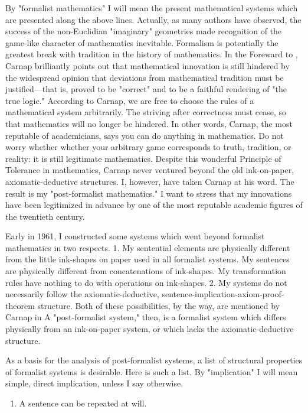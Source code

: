 \documentclass[10pt,twoside]{memoir}
\begin{document}
\begin{enumerate}
{\begin{enumerate}
By "formalist mathematics" I will mean the present mathematical 
systems which are presented along the above lines. Actually, as many authors 
have observed, the success of the non-Euclidian "imaginary" geometries 
made recognition of the game-like character of mathematics inevitable. 
Formalism is potentially the greatest break with tradition in the history of 
mathematics. In the Foreward to , Carnap 
brilliantly points out that mathematical innovation is still hindered by the 
widespread opinion that deviations from mathematical tradition must be 
justified---that is, proved to be "correct" and to be a faithful rendering of 
"the true logic." According to Carnap, we are free to choose the rules of a 
mathematical system arbitrarily. The striving after correctness must cease, so 
that mathematics will no longer be hindered.  In other words, Carnap, the most reputable 
of academicians, says you can do anything in mathematics. Do not worry 
whether whether your arbitrary game corresponds to truth, tradition, or 
reality: it is still legitimate mathematics. Despite this wonderful Principle of 
Tolerance in mathematics, Carnap never ventured beyond the old 
ink-on-paper, axiomatic-deductive structures. I, however, have taken Carnap 
at his word. The result is my "post-formalist mathematics." I want to stress 
that my innovations have been legitimized in advance by one of the most 
reputable academic figures of the twentieth century. 

Early in 1961, I constructed some systems which went beyond 
formalist mathematics in two respects. 1. My sentential elements are 
physically different from the little ink-shapes on paper used in all formalist 
systems. My sentences are physically different from concatenations of 
ink-shapes. My transformation rules have nothing to do with operations on 
ink-shapes. 2. My systems do not necessarily follow the axiomatic-deductive, 
sentence-implication-axiom-proof-theorem structure. Both of these 
possibilities, by the way, are mentioned by Carnap in  A "post-formalist system," then, is a formalist system which differs 
physically from an ink-on-paper system, or which lacks the 
axiomatic-deductive structure. 

As a basis for the analysis of post-formalist systems, a list of structural 
properties of formalist systems is desirable. Here is such a list. By 
"implication" I will mean simple, direct implication, unless I say otherwise. 
\begin{enumerate}
\item A sentence can be repeated at will. 


\end{enumerate}
\end{enumerate}}
\end{enumerate}
\end{document}
